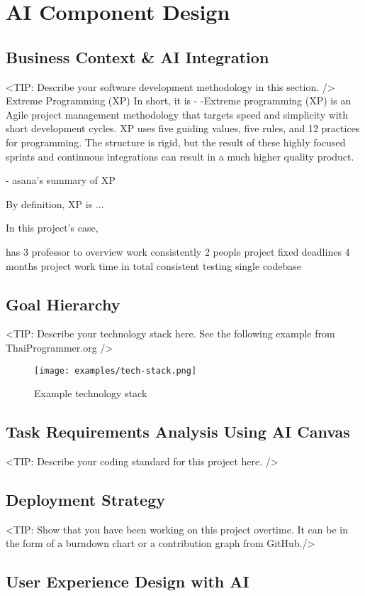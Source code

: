 \chapter{AI Component Design}
\label{chap:AI-Component-Design}

\section{Business Context \& AI Integration}
\label{section:Business-Context-AI-Integration}
<TIP: Describe your software development methodology in this section. />
Extreme Programming (XP)
In short, it is -
-Extreme programming (XP) is an Agile project management methodology that targets speed and simplicity with short development cycles. XP uses five guiding values, five rules, and 12 practices for programming. The structure is rigid, but the result of these highly focused sprints and continuous integrations can result in a much higher quality product.

- asana's summary of XP 

By definition, XP is ...

In this project's case,


has 3 professor to overview work consistently
2 people project
fixed deadlines
4 months project work time in total
consistent testing
single codebase


\section{Goal Hierarchy}
\label{section:Goal-Hierarchy}
<TIP: Describe your technology stack here. See the following example from ThaiProgrammer.org />
\begin{figure}[h]
    \centering
    \texttt{[image: examples/tech-stack.png]}
    \caption{Example technology stack}
\end{figure}

\section{Task Requirements Analysis Using AI Canvas}
\label{section:Task-Requirements-Analysis-Using-AI-Canvas}
<TIP: Describe your coding standard for this project here. />

\section{Deployment Strategy}
\label{section:Deployment-Strategy}
<TIP: Show that you have been working on this project overtime.
It can be in the form of a burndown chart or a contribution graph from GitHub./>

\section{User Experience Design with AI}
\label{section:User-Experience-Design-with-AI}